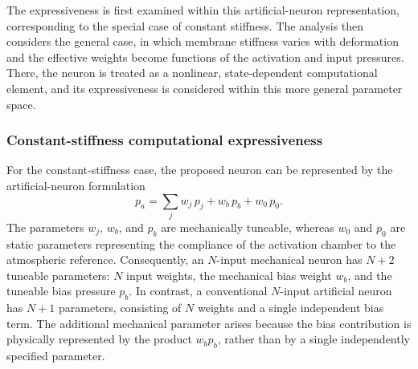 \documentclass[11pt,a4paper]{article}
\numberwithin{equation}{section}
\begin{document}
The expressiveness is first examined within this artificial-neuron representation, corresponding to the special
case of constant stiffness. The analysis then considers the general case, in which membrane stiffness varies with
deformation and the effective weights become functions of the activation and input pressures. There, the neuron is
treated as a nonlinear, state-dependent computational element, and its expressiveness is considered within this
more general parameter space.

\subsubsection{Constant-stiffness computational expressiveness}

For the constant-stiffness case, the proposed neuron can be represented by the artificial-neuron formulation
\begin{equation}
  p_a = \sum_j w_j\,p_j + w_b\,p_b + w_0\,p_0 .
  \label{eq:ann-with-reference}
\end{equation}
The parameters $w_j$, $w_b$, and $p_b$ are mechanically tuneable, whereas $w_0$ and $p_0$ are static parameters
representing the compliance of the activation chamber to the atmospheric reference. Consequently, an $N$-input
mechanical neuron has $N+2$ tuneable parameters: $N$ input weights, the mechanical bias weight $w_b$, and the
tuneable bias pressure $p_b$. In contrast, a conventional $N$-input artificial neuron has $N+1$ parameters,
consisting of $N$ weights and a single independent bias term. The additional mechanical parameter arises because the
bias contribution is physically represented by the product $w_b p_b$, rather than by a single independently
specified parameter.
\end{document}
